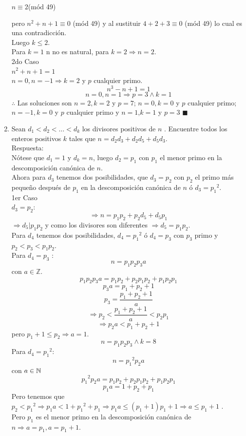 \documentclass{book}
\newcommand{\Z}{\mathbb{Z}} \def\max{\mathop{\mbox{\rm máx}}} %
\begin{document}
\begin{enumerate}
\begin{center}
				$n\equiv 2$(mód 49)
			\end{center}
pero $n^2+n+1\equiv 0$ (mód 49) y al sustituir $4+2+3\equiv 0$ (mód 49) lo cual es una contradicción.\\ Luego $k\leq 2$.\\
Para $k=1$ n no es natural, para $k=2\Rightarrow     n=2$.\\
2do Caso\\
$n^2+n+1=1$\\ 
$n=0,n=-1 \Rightarrow k=2$ y $p $ cualquier primo.
$$n^3-n+1=1$$
$$n=0,n=1\Rightarrow p=3\wedge k=1$$
$\therefore$ Las soluciones son $n=2,k=2$ y $p=7$; $n=0,k=0$ y $ p$ cualquier primo; $n=-1,k=0$ y $p$ cualquier primo y $n=1$,$k=1$ y $p=3$ $\blacksquare$\\
			\item Sean $d_1<d_2< \ldots  <d_k$  los divisores positivos de $n$ . Encuentre todos los enteros positivos $k$  tales que 	            		$n=d_2d_3+d_2d_5+d_5d_3$.\\
			Respuesta:\\
			Nótese que $d_1=1$ y $d_k=n$, luego $d_2=p_1$ con $p_1$  el menor primo en la descomposición canónica de $n$.\\
				Ahora para $d_3$ tenemos dos posibilidades, que $d_3=p_2$ con $p_2$ el primo más pequeño después de $p_1$ en la descomposición canónica de $n$ ó $d_3={p_1}^2$.\\
1er Caso\\ 
$d_3=p_2$:
$$\Rightarrow n=p_1 p_2+p_2 d_5+d_5 p_1$$
$\Rightarrow d_5|p_1 p_2$ y como los divisores son diferentes $\Rightarrow d_5=p_1 p_2$.\\
Para $d_4$  tenemos dos posibilidades, $d_4={p_1}^2$ ó $d_4= p_3$ con $p_3$ primo y $p_2<p_3<p_1 p_2$.\\
Para $d_4=p_3$ :\\
$$n=p_ 1 p_2 p_3 a$$ con $a\in\Z$.
$$p_1 p_2 p_3 a=p_1 p_2+p_2 p_1 p_2+p_1 p_2 p_1$$
$$p_3 a=p_1+p_2+1$$
$$p_3=\frac{p_1+p_2+1}{a}$$
$$\Rightarrow p_2<\frac{p_1+p_2+1}{a}<p_2 p_1$$
$$\Rightarrow p_2 a<p_1+p_2+1$$ 
pero $p_1+1\leq p_2 \Rightarrow a=1$.
$$n=p_1 p_ 2 p_ 3  \wedge k=8$$
Para $d_4={p_1}^2$:
$$n={p_ 1}^2 p_2 a$$ con $a\in\mathbb{N}$
$${p_ 1}^2 p_ 2 a=p_1 p_2+p_2 p_1 p_2+p_1 p_2 p_1$$
$$p_ 1 a=1+p_2+p_1$$
Pero tenemos que $p_2<{p_ 1}^2\Rightarrow p_1 a<1+{p_ 1}^2+p_1\Rightarrow p_1  a\leq(p_1 +1) p_1 +1\Rightarrow a\leq p_1+1$ .\\
Pero $p_1 $ es el menor primo en la descomposición canónica de $n\Rightarrow a= p_1,a= p_1+1$.\\

\end{enumerate}
\end{document}
